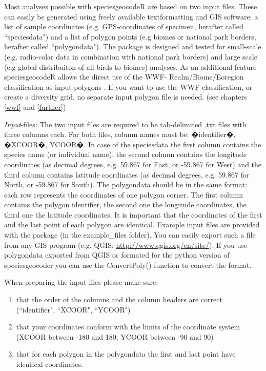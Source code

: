 \documentclass[a4paper,titlepage,11pt]{scrreprt}
\begin{document}
Most analyses possible with speciesgeocodeR are based on two input files. These can easily be generated using freely available textformatting and GIS software: a list of sample coordinates (e.g. GPS-coordinates of specimen, herafter called ``speciesdata") and a list of polygon points (e.g biomes or national park borders, herafter called ``polygondata"). The package is designed and tested for small-scale (e.g. radio-colar data in combination with national park borders) and large scale (e.g global distribuiton of all birds to biomes) analyses. As an additional feature speciesgeocodeR allows the direct use of the WWF- Realm/Biome/Eoregion classification as input polygons . If you want to use the WWF classification, or create a diversity grid, no separate input polygon file is needed. (see chapters \ref{wwf} and \ref{further})

\textit{Input}-files: The two input files are required to be tab-delimited .txt files with three columns each. For both files, column names must be: �identifier�, �XCOOR�, YCOOR�. In case of the speciesdata the first column contains the species name (or individual name), the second column contains the longitude coordinates (as decimal degrees, e.g. 59.867 for East, or -59.867 for West) and the third column contains latitude coordinates (as decimal degrees, e.g. 59.867 for North, or -59.867 for South). The polygondata should be in the same format: each row represents the coordinates of one polygon corner. The first column contains the polygon identifier, the second one the longitude coordinates, the third one the latitude coordinates. It is important that the coordinates of the first and the last point of each polygon are identical. Example input files are provided with the package (in the example\_files folder). You can easily export such a file from any GIS program (e.g. QGIS: \url{http://www.qgis.org/en/site/}). If you use  polygondata exported from QGIS or formated for the python version of speciesgeocoder you can use the ConvertPoly() function to convert the format.

When preparing the input files please make sure:
\begin{enumerate}
\item that the order of the columns and the column headers are correct (``identifier", ``XCOOR", ``YCOOR")
\item that your coordinates conform with the limits of the coordinate system (XCOOR between -180 and 180; YCOOR between -90 and 90)
\item that for each polygon in the polygondata the first and last point have identical coordinates.
\end{enumerate}
\end{document}
